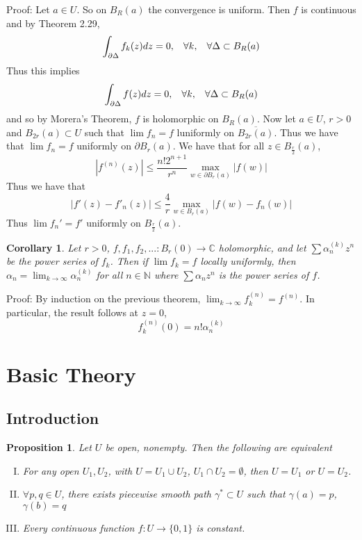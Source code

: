 \documentclass[11pt]{article}
\theoremstyle{plain}
\newtheorem{corollary}[theorem]{Corollary}
\newtheorem{proposition}[theorem]{Proposition}
\theoremstyle{definition}
\newcommand{\C}{\mathbb{C}}
\begin{document}
Proof: Let $a \in U$. So on $B_R(a)$ the convergence is uniform. Then $f$ is continuous and by Theorem 2.29, 
$$ \int_{\partial\Delta} f_k(z)dz = 0, \hspace{3mm} \forall k, \hspace{3mm} \forall \Delta \subset B_R(a) $$
Thus this implies 
$$ \int_{\partial\Delta} f(z)dz = 0, \hspace{3mm} \forall k, \hspace{3mm} \forall \Delta \subset B_R(a) $$
and so by Morera's Theorem, $f$ is holomorphic on $B_R(a)$. Now let $a \in U$, $r > 0$ and $B_{2r}(a) \subset U$ such that $\lim f_n = f$ luniformly on $\overline{B_{2r}(a)}$. Thus we have that $\lim f_n = f$ uniformly on $\partial B_r(a)$. We have that for all $z \in B_{\frac{r}{2}}(a)$,
$$ |f^{(n)}(z)| \leq \frac{n!2^{n+1}}{r^n} \max_{w \in \partial B_r(a)} |f(w)| $$
Thus we have that 
$$ |f'(z) - f'_n(z)| \leq \frac{4}{r} \max_{w\in B_r(a)} |f(w) - f_n(w)| $$
Thus $\lim f_n' = f'$ uniformly on $B_{\frac{r}{2}}(a)$.

\begin{corollary}
Let $r > 0$, $f, f_1, f_2, ...: B_r(0) \to \C$ holomorphic, and let $\sum \alpha_n^{(k)}z^n$ be the power series of $f_k$. Then if $\lim f_k = f$ locally uniformly, then $\alpha_n = \lim_{k \to \infty}\alpha_n^{(k)}$ for all $n \in \mathbb{N}$ where $\sum \alpha_n z^n$ is the power series of $f$. 
\end{corollary}

Proof: By induction on the previous theorem, $\lim_{k \to\infty} f_k^{(n)} = f^{(n)}$. In particular, the result follows at $z = 0$,
$$ f_k^{(n)}(0) = n! \alpha_n^{(k)} $$

\section{Basic Theory}

\subsection{Introduction}
\begin{proposition}
Let $U$ be open, nonempty. Then the following are equivalent 
\begin{enumerate}[(I)]
\item For any open $U_1, U_2$, with $U = U_1 \cup U_2$, $U_1 \cap U_2 = \emptyset$, then $U = U_1$ or $U = U_2$.
\item $\forall p, q\in U$, there exists piecewise smooth path $\gamma^* \subset U$ such that $\gamma(a) = p$, $\gamma(b) = q$
\item Every continuous function $f:U \to\{0,1\}$ is constant.
\end{enumerate}
\end{proposition}
\end{document}
